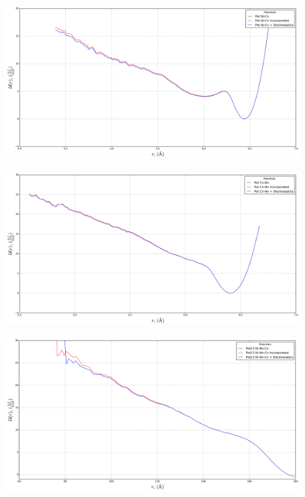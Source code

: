 \documentclass[10pt,a4paper,twoside]{article}
\begin{document}
\begin{figure}[H]
  \begin{center}
	\includegraphics[width=0.8 \textwidth]{./graphs/PtsChargedSys10}
  \end{center}
\end{figure}

\begin{figure}[H]
  \begin{center}
	\includegraphics[width=0.8 \textwidth]{./graphs/PtsChargedSys11}
  \end{center}
\end{figure}

\begin{figure}[H]
  \begin{center}
	\includegraphics[width=0.8 \textwidth]{./graphs/PtsChargedSys12}
  \end{center}
\end{figure}
\end{document}
